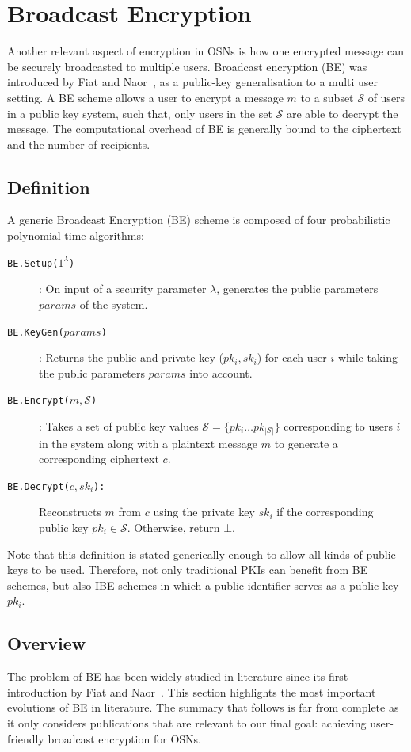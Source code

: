 \section{Broadcast Encryption}
Another relevant aspect of encryption in OSNs is how one encrypted message can be securely broadcasted to multiple users. Broadcast encryption (BE) was introduced by Fiat and Naor~\cite{art:FiatN93}, as a public-key generalisation to a multi user setting. A BE scheme allows a user to encrypt a message $m$ to a subset $\mathcal{S}$ of users in a public key system, such that, only users in the set $\mathcal{S}$ are able to decrypt the message. The computational overhead of BE is generally bound to the ciphertext and the number of recipients.

\subsection{Definition}
A generic Broadcast Encryption (BE) scheme is composed of four probabilistic polynomial time algorithms:

\begin{description}
    \item[\texttt{BE.Setup($1^{\lambda}$)}]: On input of a security parameter $\lambda$, generates the public parameters $params$ of the system.
    \item[\texttt{BE.KeyGen($params$)}]: Returns the public and private key ($pk_i,sk_i$) for each user $i$ while taking the public parameters $params$ into account.
    \item[\texttt{BE.Encrypt($m, \mathcal{S}$)}]: Takes a set of public key values $\mathcal{S}=\{pk_i \ldots pk_{|\mathcal{S}|}\}$ corresponding to users $i$ in the system along with a plaintext message $m$ to generate a corresponding ciphertext $c$.
    \item[\texttt{BE.Decrypt($c, sk_i$):}] Reconstructs $m$ from $c$ using the private key $sk_i$ if the corresponding public key $pk_i \in \mathcal{S}$. Otherwise, return $\bot$.
\end{description}

Note that this definition is stated generically enough to allow all kinds of public keys to be used. Therefore, not only traditional PKIs can benefit from BE schemes, but also IBE schemes in which a public identifier  serves as a public key $pk_i$.

\subsection{Overview}
\label{sec:evolution_of_be}
The problem of BE has been widely studied in literature since its first introduction by Fiat and Naor~\cite{art:FiatN93}. This section highlights the most important evolutions of BE in literature. The summary that follows is far from complete as it only considers publications that are relevant to our final goal: achieving user-friendly broadcast encryption for OSNs.

